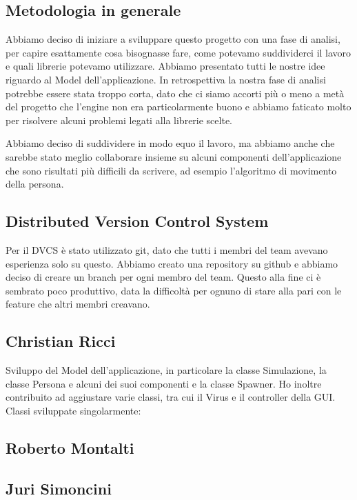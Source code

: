 \subsection{Metodologia in generale}

Abbiamo deciso di iniziare a sviluppare questo progetto con una fase di analisi, per capire esattamente cosa bisognasse fare, come potevamo suddividerci il lavoro e quali librerie potevamo utilizzare. Abbiamo presentato tutti le nostre idee riguardo al Model dell'applicazione. In retrospettiva la nostra fase di analisi potrebbe essere stata troppo corta, dato che ci siamo accorti più o meno a metà del progetto che l'engine non era particolarmente buono e abbiamo faticato molto per risolvere alcuni problemi legati alla librerie scelte.

Abbiamo deciso di suddividere in modo equo il lavoro, ma abbiamo anche che sarebbe stato meglio collaborare insieme su alcuni componenti dell'applicazione che sono risultati più difficili da scrivere, ad esempio l'algoritmo di movimento della persona.

\subsection{Distributed Version Control System}

Per il DVCS è stato utilizzato git, dato che tutti i membri del team avevano esperienza solo su questo. Abbiamo creato una repository su github e abbiamo deciso di creare un branch per ogni membro del team. Questo alla fine ci è sembrato poco produttivo, data la difficoltà per ognuno di stare alla pari con le feature che altri membri creavano.

\subsection{Christian Ricci}

Sviluppo del Model dell'applicazione, in particolare la classe Simulazione, la classe Persona e alcuni dei suoi componenti e la classe Spawner. Ho inoltre contribuito ad aggiustare varie classi, tra cui il Virus e il controller della GUI.
Classi sviluppate singolarmente:

\subsection{Roberto Montalti}

\subsection{Juri Simoncini}

